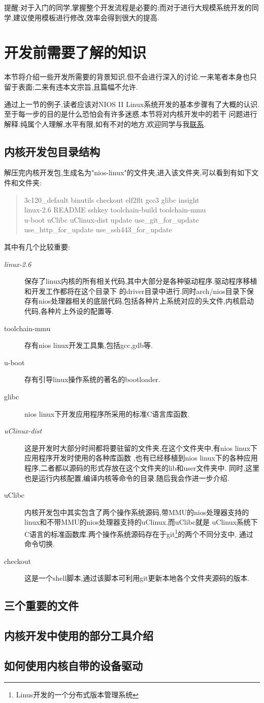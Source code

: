 \documentclass[12pt,a4paper,titlepage]{article}
\begin{document}
提醒:对于入门的同学,掌握整个开发流程是必要的;而对于进行大规模系统开发的同学,建议使用模板进行修改,效率会得到很大的提高.
\newpage{}
\section{开发前需要了解的知识}
本节将介绍一些开发所需要的背景知识,但不会进行深入的讨论.一来笔者本身也只留于表面;二来有违本文宗旨,且篇幅不允许.

通过上一节的例子,读者应该对NIOS II Linux系统开发的基本步骤有了大概的认识.至于每一步的目的是什么恐怕会有许多迷惑.本节将对内核开发中的若干
问题进行解释.纯属个人理解,水平有限,如有不对的地方,欢迎同学与我\href{mailto:cfistalent@gmail.com}{联系}.
\subsection{内核开发包目录结构}
解压完内核开发包,生成名为"nios-linux"的文件夹,进入该文件夹,可以看到有如下文件和文件夹:
\begin{quote}
3c120\_default binutils checkout elf2flt gcc3 glibc insight\\
linux-2.6 README sshkey toolchain-build toolchain-mmu\\
u-boot uClibc uClinux-dist update use\_git\_for\_update\\
use\_http\_for\_update use\_ssh443\_for\_update
\end{quote}
其中有几个比较重要:
\begin{description}
\item[\textit{linux-2.6}] 保存了linux内核的所有相关代码,其中大部分是各种驱动程序.驱动程序移植和开发工作都将在这个目录下
的driver目录中进行.同时arch/nios目录下保存有nios处理器相关的底层代码,包括各种片上系统对应的头文件,内核启动代码,各种片上外设的配置等.
\item[toolchain-mmu] 存有nios linux开发工具集,包括gcc,gdb等.
\item[u-boot] 存有引导linux操作系统的著名的bootloader.
\item[glibc] nios linux下开发应用程序所采用的标准C语言库函数.
\item[\textit{uClinux-dist}] 这是开发时大部分时间都将要驻留的文件夹,在这个文件夹中,有nios linux下应用程序开发时使用的各种库函数
,也有已经移植到nios linux下的各种应用程序,二者都以源码的形式存放在这个文件夹的lib和user文件夹中.
同时,这里也是运行内核配置,编译内核等命令的目录.随后我会作进一步介绍.
\item[uClibc] 内核开发包中其实包含了两个操作系统源码,带MMU的nios处理器支持的linux和不带MMU的nios处理器支持的uClinux.而uClibc就是
uClinux系统下C语言的标准函数库.两个操作系统源码存在于git\footnote{Linus开发的一个分布式版本管理系统}的两个不同分支中,
通过命令切换.
\item[checkout] 这是一个shell脚本,通过该脚本可利用git更新本地各个文件夹源码的版本.
\end{description}

\subsection{三个重要的文件}
\subsection{内核开发中使用的部分工具介绍}
\subsection{如何使用内核自带的设备驱动}
\end{document}
